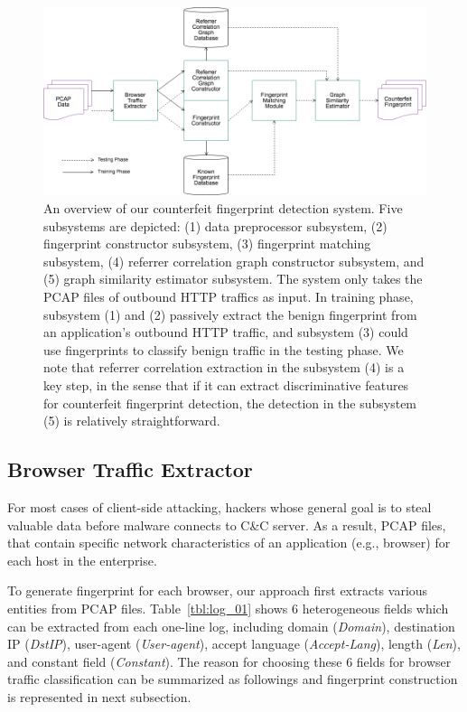 \begin{figure}[!t]
\centering
\includegraphics[width=400pt]{image/sa.png}
\caption{An overview of our counterfeit fingerprint detection system. Five subsystems are depicted: (1) data preprocessor subsystem, (2) fingerprint constructor subsystem, (3) fingerprint matching subsystem, (4) referrer correlation graph constructor subsystem, and (5) graph similarity estimator subsystem. The system only takes the PCAP files of outbound HTTP traffics as input. In training phase, subsystem (1) and (2) passively extract the benign fingerprint from an application's outbound HTTP traffic, and subsystem (3) could use fingerprints to classify benign traffic in the testing phase. We note that referrer correlation extraction in the subsystem (4) is a key step, in the sense that if it can extract discriminative features for counterfeit fingerprint detection, the detection in the subsystem (5) is relatively straightforward.}
\label{fig:sa}
\end{figure}

\subsection{Browser Traffic Extractor}

For most cases of client-side attacking, hackers whose general goal is to steal valuable data before malware connects to C\&C server. As a result, PCAP files, that contain specific network characteristics of an application (e.g., browser) for each host in the enterprise. 

To generate fingerprint for each browser, our approach first extracts various entities from PCAP files. Table~\ref{tbl:log_01} shows 6 heterogeneous fields which can be extracted from each one-line log, including domain ({\em Domain}), destination IP ({\em DstIP}), user-agent ({\em User-agent}), accept language ({\em Accept-Lang}), length ({\em Len}), and constant field ({\em Constant}). The reason for choosing these 6 fields for browser traffic classification can be summarized as followings and fingerprint construction is represented in next subsection.

